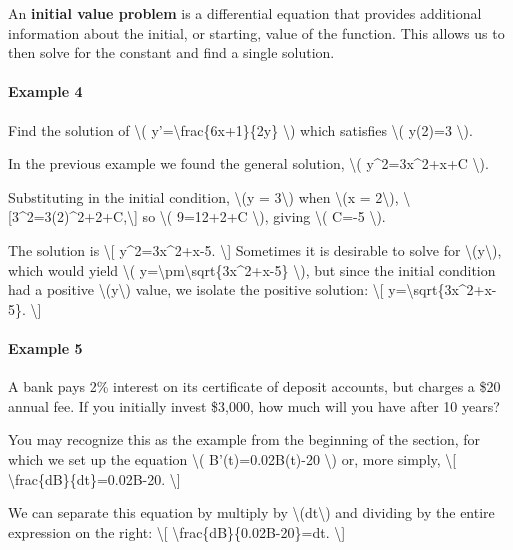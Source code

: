 An \textbf{initial value problem} is a differential equation that
provides additional information about the initial, or starting, value of
the function. This allows us to then solve for the constant and find a
single solution.

\hypertarget{example-4}{%
\paragraph{Example 4}\label{example-4}}

Find the solution of \textbackslash{}(
y'=\textbackslash{}frac\{6x+1\}\{2y\} \textbackslash{}) which satisfies
\textbackslash{}( y(2)=3 \textbackslash{}).

In the previous example we found the general solution, \textbackslash{}(
y\^{}2=3x\^{}2+x+C \textbackslash{}).

Substituting in the initial condition, \textbackslash{}(y =
3\textbackslash{}) when \textbackslash{}(x = 2\textbackslash{}),
\textbackslash{}{[}3\^{}2=3(2)\^{}2+2+C,\textbackslash{}{]} so
\textbackslash{}( 9=12+2+C \textbackslash{}), giving \textbackslash{}(
C=-5 \textbackslash{}).

The solution is \textbackslash{}{[} y\^{}2=3x\^{}2+x-5.
\textbackslash{}{]} Sometimes it is desirable to solve for
\textbackslash{}(y\textbackslash{}), which would yield \textbackslash{}(
y=\textbackslash{}pm\textbackslash{}sqrt\{3x\^{}2+x-5\}
\textbackslash{}), but since the initial condition had a positive
\textbackslash{}(y\textbackslash{}) value, we isolate the positive
solution: \textbackslash{}{[} y=\textbackslash{}sqrt\{3x\^{}2+x-5\}.
\textbackslash{}{]}

\hypertarget{example-5}{%
\paragraph{Example 5}\label{example-5}}

A bank pays 2\% interest on its certificate of deposit accounts, but
charges a \$20 annual fee. If you initially invest \$3,000, how much
will you have after 10 years?

You may recognize this as the example from the beginning of the section,
for which we set up the equation \textbackslash{}( B'(t)=0.02B(t)-20
\textbackslash{}) or, more simply, \textbackslash{}{[}
\textbackslash{}frac\{dB\}\{dt\}=0.02B-20. \textbackslash{}{]}

We can separate this equation by multiply by
\textbackslash{}(dt\textbackslash{}) and dividing by the entire
expression on the right: \textbackslash{}{[}
\textbackslash{}frac\{dB\}\{0.02B-20\}=dt. \textbackslash{}{]}

